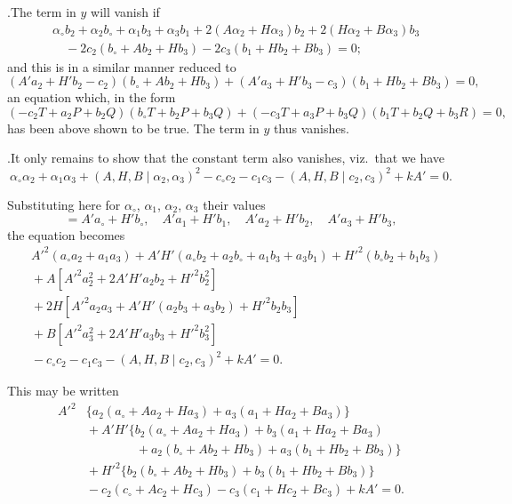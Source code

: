 \documentclass[11pt]{article}
\begin{document}
\medskip

.\quad The term in $y$ will vanish if
\begin{align*}
&\alpha_{\circ}b_2+\alpha_2b_{\circ}+\alpha_1b_3+\alpha_3b_1+2(A\alpha_2+H\alpha_3)b_2+2(H\alpha_2+B\alpha_3)b_3\\
&\quad -2c_2(b_{\circ}+Ab_2+Hb_3)-2c_3(b_1+Hb_2+Bb_3) = 0;
\end{align*}
and this is in a similar manner reduced to
\[
(A'a_2+H'b_2-c_2)(b_{\circ}+Ab_2+Hb_3)+(A'a_3+H'b_3-c_3)(b_1+Hb_2+Bb_3) = 0,
\]
an equation which, in the form
\[
(-c_2T+a_2P+b_2Q)(b_{\circ}T+b_2P+b_3Q)+(-c_3T+a_3P+b_3Q)(b_1T+b_2Q+b_3R) = 0,
\]
has been above shown to be true. The term in $y$ thus vanishes.

\medskip

.\quad It only remains to show that the constant term also vanishes, viz.\ that we have
\[
\alpha_{\circ}\alpha_2+\alpha_1\alpha_3+(A,H,B\mid \alpha_2,\alpha_3)^2 - c_{\circ}c_2-c_1c_3-(A,H,B\mid c_2,c_3)^2+kA' = 0.
\]

Substituting here for $\alpha_{\circ}$, $\alpha_1$, $\alpha_2$, $\alpha_3$ their values
\[
= A'a_{\circ}+H'b_{\circ},\quad A'a_1+H'b_1,\quad A'a_2+H'b_2,\quad A'a_3+H'b_3,
\]
the equation becomes
\begin{align*}
&A'^2(a_{\circ}a_2+a_1a_3) + A'H'(a_{\circ}b_2+a_2b_{\circ}+a_1b_3+a_3b_1) + H'^2(b_{\circ}b_2+b_1b_3)\\
&{}+ A[A'^2a_2^2+2A'H'a_2b_2+H'^2b_2^2]\\
&{}+ 2H[A'^2a_2a_3+A'H'(a_2b_3+a_3b_2)+H'^2b_2b_3]\\
&{}+ B[A'^2a_3^2+2A'H'a_3b_3+H'^2b_3^2]\\
&{}- c_{\circ}c_2-c_1c_3-(A,H,B\mid c_2,c_3)^2+kA' = 0.
\end{align*}

This may be written
\begin{align*}
A'^2&\{a_2(a_{\circ}+Aa_2+Ha_3)+a_3(a_1+Ha_2+Ba_3)\}\\
&{}+ A'H'\{b_2(a_{\circ}+Aa_2+Ha_3)+b_3(a_1+Ha_2+Ba_3)\\
&\qquad\qquad + a_2(b_{\circ}+Ab_2+Hb_3)+a_3(b_1+Hb_2+Bb_3)\}\\
&{}+ H'^2\{b_2(b_{\circ}+Ab_2+Hb_3)+b_3(b_1+Hb_2+Bb_3)\}\\
&{}- c_2(c_{\circ}+Ac_2+Hc_3)-c_3(c_1+Hc_2+Bc_3)+kA' = 0.
\end{align*}
\end{document}
